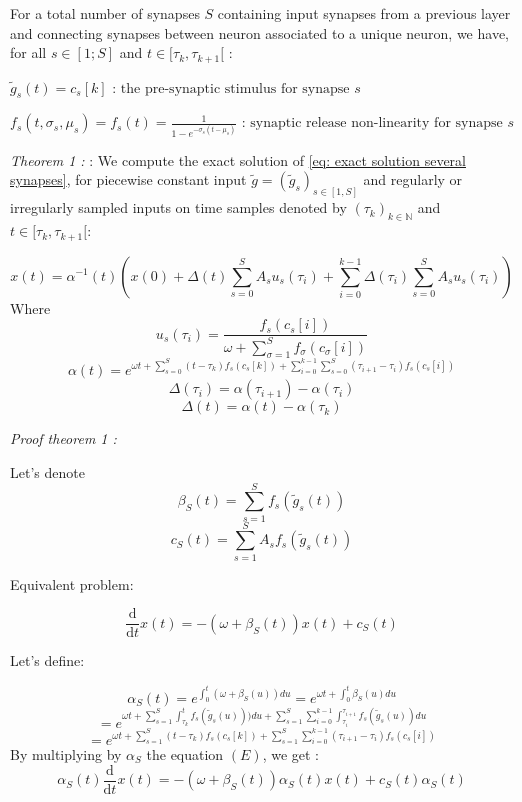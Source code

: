 \documentclass[journal]{IEEEtran}
\begin{document}
For a total number of synapses $S$ containing input synapses from a previous layer and connecting synapses between neuron associated to a unique neuron, we have, for all \(s \in [1; S] \) and $t\in [\tau_k, \tau_{k+1}[$ :

$\tilde{g}_s(t) = c_s[k] \text{ : the pre-synaptic stimulus for synapse $s$}$

$f_s(t, \sigma_s, \mu_s) = f_s(t) = \frac{1}{1 - e^{-\sigma _s (t - \mu_s)}} \text{ : synaptic release non-linearity for synapse $s$}$
\vspace{1cm}

\textit{Theorem 1 :} : We compute the exact solution of \ref{eq: exact solution several synapses}, for piecewise constant input $\tilde{g} = (\tilde{g}_s)_{s\in [1, S]}$ and regularly or irregularly sampled inputs on time samples denoted by $(\tau_k)_{k\in \mathbb{N}} $  and $t\in [\tau_k, \tau_{k+1}[$:


\begin{equation}
 x(t) =  \alpha^{-1}(t) \left( x(0) + \Delta(t)\sum_{s=0}^{S} A_s u_s(\tau_i) +\sum_{i=0}^{k-1} \Delta(\tau_i)\sum_{s=0}^{S} A_s u_s(\tau_i) \right)
 \label{eq:exact solution}
\end{equation}
Where
\[
    u_s(\tau_i) = \frac{f_s(c_s[i])}{\omega + \sum_{\sigma=1}^{S}  f_{\sigma}(c_{\sigma}[i])}
\]
\[
    \alpha(t) = e^{\omega t + \sum_{s=0}^{S} (t-\tau_k)f_s(c_s[k])+\sum_{i=0}^{k-1}\sum_{s=0}^{S} (\tau_{i+1}-\tau_i)f_s(c_s[i])}
\]
\[
    \Delta(\tau_i) =\alpha(\tau_{i+1}) - \alpha(\tau_i)
\]
\[
    \Delta(t) =\alpha(t) - \alpha(\tau_k)
\]

\textit{Proof theorem 1 :}  


Let's denote 
\[
\beta_S(t) = \sum_{s=1}^S f_s(\tilde{g}_s(t))
\]
\[
c_S(t) = \sum_{s=1}^S A_s f_s(\tilde{g}_s(t))
\]

Equivalent problem:

\[
\frac{\mathrm{d}}{\mathrm{d}t} x(t)= - (\omega + \beta_S(t)) x (t) + c_S(t)
\]

Let's define:

\[
\alpha_S(t) = e^{\int_0^t (\omega+ \beta_S(u)) du} = e^{\omega t + \int_0^t \beta_S(u) du}
\]
\[
= e^{\omega t + \sum_{s=1}^{S} \int_{\tau_k}^{t} f_s(\tilde{g}_s(u))) du + \sum_{s=1}^{S} \sum_{i=0}^{k-1} \int_{\tau_i}^{\tau_{i+1}} f_s(\tilde{g}_s(u)) du} 
\]
\[
= 
e^{\omega t + \sum_{s=1}^{S} (t-\tau_k)f_s(c_s[k]) + \sum_{s=1}^{S} \sum_{i=0}^{k-1} (\tau_{i+1}-\tau_i)f_s(c_s[i])} 
\]
By multiplying by $\alpha_S$ the equation $(E)$, we get : 
\[
\alpha_S(t) \frac{\mathrm{d}}{\mathrm{d}t}x(t)  = -  (\omega + \beta_S(t)) \alpha_S(t) x (t) + c_S(t) \alpha_S(t)
\]
\end{document}
